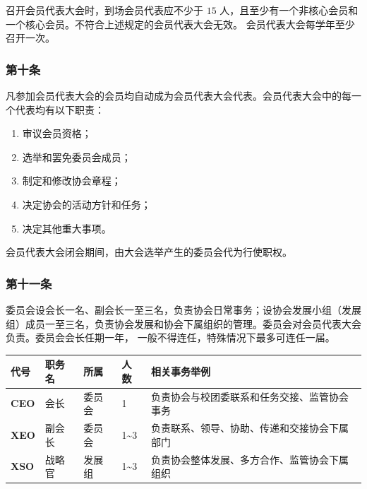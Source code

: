 \documentclass[
]{ctexart}
\begin{document}
召开会员代表大会时，到场会员代表应不少于 \(15\)
人，且至少有一个非核心会员和一个核心会员。不符合上述规定的会员代表大会无效。
会员代表大会每学年至少召开一次。

\hypertarget{ux7b2cux5341ux6761-ux4f1aux5458ux4ee3ux8868ux7684ux804cux8d23}{%
\subsubsection{第十条}\label{ux7b2cux5341ux6761-ux4f1aux5458ux4ee3ux8868ux7684ux804cux8d23}}

凡参加会员代表大会的会员均自动成为会员代表大会代表。会员代表大会中的每一个代表均有以下职责：

\begin{enumerate}
\def\labelenumi{\arabic{enumi}.}
\item
  审议会员资格；
\item
  选举和罢免委员会成员；
\item
  制定和修改协会章程；
\item
  决定协会的活动方针和任务；
\item
  决定其他重大事项。
\end{enumerate}

会员代表大会闭会期间，由大会选举产生的委员会代为行使职权。

\hypertarget{ux7b2cux5341ux4e00ux6761-ux59d4ux5458ux4f1aux7ec4ux7ec7ux7ed3ux6784}{%
\subsubsection{第十一条}\label{ux7b2cux5341ux4e00ux6761-ux59d4ux5458ux4f1aux7ec4ux7ec7ux7ed3ux6784}}

委员会设会长一名、副会长一至三名，负责协会日常事务；设协会发展小组（发展组）成员一至三名，负责协会发展和协会下属组织的管理。委员会对会员代表大会负责。委员会会长任期一年，
一般不得连任，特殊情况下最多可连任一届。

{
\small
\begin{longtable}[]{@{}lllll@{}}
\toprule()
\textbf{代号} & \textbf{职务名} & \textbf{所属} & \textbf{人数} & \textbf{相关事务举例} \\
\midrule()
\endhead
\textbf{CEO} & 会长 & 委员会 & 1 &
负责协会与校团委联系和任务交接、监管协会事务 \\
\textbf{XEO} & 副会长 & 委员会 & 1\textasciitilde 3 &
负责联系、领导、协助、传递和交接协会下属部门 \\
\textbf{XSO} & 战略官 & 发展组 & 1\textasciitilde 3 &
负责协会整体发展、多方合作、监管协会下属组织 \\
\bottomrule()
\end{longtable}
}
\end{document}
